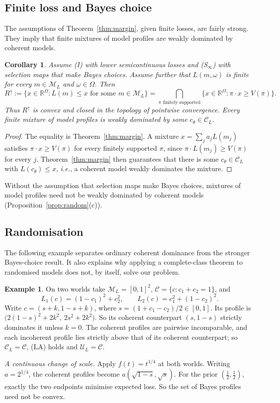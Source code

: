 \documentclass[11pt]{article}
\newtheorem{corollary}[theorem]{Corollary}
\theoremstyle{definition}
\newtheorem{example}[theorem]{Example}
\theoremstyle{remark}
\newcommand{\R}{\mathbb R}
\newcommand{\M}{\mathcal M}
\newcommand{\C}{\mathcal C}
\newcommand{\U}{\mathcal U}
\begin{document}
\subsection{Finite loss and Bayes choice}\label{sec:convexconsequence}
The assumptions of Theorem~\ref{thm:margin}, given finite losses, are fairly strong. They imply that finite mixtures of model profiles are weakly dominated by coherent models.


\begin{corollary}\label{cor:upperconvex}
Assume (I) with lower semicontinuous losses and (S$_\infty$) with selection maps that make Bayes choices. Assume further that $L(m,\omega)$ is finite for every $m\in\M_L$ and $\omega\in\Omega$. Then
\[
 R^\uparrow:=\{x\in\R^\Omega:L(m)\le x\text{ for some }m\in\M_L\}
 =\bigcap_{\pi\text{ finitely supported}}
 \{x\in\R^\Omega:\pi\cdot x\ge V(\pi)\}.
\]
Thus $R^\uparrow$ is convex and closed in the topology of pointwise convergence. Every finite mixture of model profiles is weakly dominated by some $c_\theta\in\C_L$.
\end{corollary}
\begin{proof}
The equality is Theorem~\ref{thm:margin}. A mixture $x=\sum_j a_jL(m_j)$ satisfies $\pi\cdot x\ge V(\pi)$ for every finitely supported $\pi$, since $\pi\cdot L(m_j)\ge V(\pi)$ for every $j$. Theorem~\ref{thm:margin} then guarantees that there is some $c_\theta\in\C_L$ with $L(c_\theta)\le x$, \textit{i.e.}, a coherent model weakly dominates the mixture.
\end{proof}
Without the assumption that selection maps make Bayes choices, mixtures of model profiles need not be weakly dominated by coherent models (Proposition~\ref{prop:random}(c)).

\subsection{Randomisation}\label{sec:random}
The following example separates ordinary coherent dominance from the stronger Bayes-choice result. It also explains why applying a complete-class theorem to randomised models does not, by itself, solve our problem.
\begin{example}\label{ex:rescale}
On two worlds take $\M_L=[0,1]^2$, $\C=\{c:c_1+c_2=1\}$, and
\[
 L_1(c)=(1-c_1)^2+c_2^2,\qquad L_2(c)=c_1^2+(1-c_2)^2.
\]
Write $c=(s+k,1-s+k)$, where $s=(1+c_1-c_2)/2\in[0,1]$. Its profile is $\bigl(2(1-s)^2+2k^2,\ 2s^2+2k^2\bigr)$. So its coherent counterpart $(s,1-s)$ strictly dominates it unless $k=0$. The coherent profiles are pairwise incomparable, and each incoherent profile lies strictly above that of its coherent counterpart; so $\C_L=\C$, (LA) holds and $\U_L=\C$.

\emph{A continuous change of scale.} Apply $f(t)=t^{1/4}$ at both worlds. Writing $a=2^{1/4}$, the coherent profiles become $a(\sqrt{1-s},\sqrt s)$. For the prior $(\tfrac12,\tfrac12)$, exactly the two endpoints minimise expected loss. So the set of Bayes profiles need not be convex.

\end{example}
\end{document}
